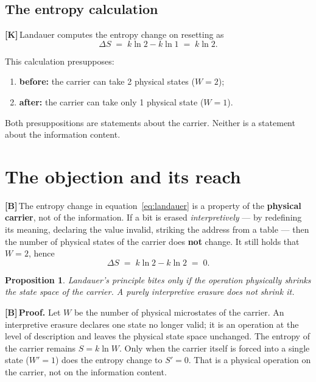 \documentclass[11pt,a4paper]{article}
\newcommand{\LK}{\textcolor{layK}{\textbf{\footnotesize\textsf{[K]}}}\,}
\newcommand{\LB}{\textcolor{layB}{\textbf{\footnotesize\textsf{[B]}}}\,}
\newcommand{\qedsq}{\raisebox{0.03em}{\framebox[0.62em]{\rule{0pt}{0.42em}}}}
\theoremstyle{ffgft}
\newtheorem{satz}{Proposition}
\begin{document}
\subsection{The entropy calculation}

\LK Landauer computes the entropy change on resetting as
\begin{equation}
  \Delta S \;=\; k \ln 2 - k \ln 1 \;=\; k \ln 2 .
  \label{eq:landauer}
\end{equation}

This calculation presupposes:
\begin{enumerate}[leftmargin=1.6em,itemsep=0.2em]
  \item \textbf{before:} the carrier can take 2 physical states ($W=2$);
  \item \textbf{after:} the carrier can take only 1 physical state ($W=1$).
\end{enumerate}

Both presuppositions are statements about the carrier. Neither is a statement
about the information content.

\section{The objection and its reach}

\LB The entropy change in equation~\eqref{eq:landauer} is a property of the
\textbf{physical carrier}, not of the information. If a bit is erased
\emph{interpretively} --- by redefining its meaning, declaring the value invalid,
striking the address from a table --- then the number of physical states of the
carrier does \textbf{not} change. It still holds that $W = 2$, hence
\begin{equation}
  \Delta S \;=\; k \ln 2 - k \ln 2 \;=\; 0 .
  \label{eq:interpretive}
\end{equation}

\begin{satz}
Landauer's principle bites only if the operation physically shrinks the state
space of the carrier. A purely interpretive erasure does not shrink it.
\end{satz}

\LB \textbf{Proof.} Let $W$ be the number of physical microstates of the carrier.
An interpretive erasure declares one state no longer valid; it is an operation at
the level of description and leaves the physical state space unchanged. The
entropy of the carrier remains $S = k\ln W$. Only when the carrier itself is
forced into a single state ($W' = 1$) does the entropy change to $S' = 0$. That is
a physical operation on the carrier, not on the information content.
\hfill\qedsq
\end{document}
